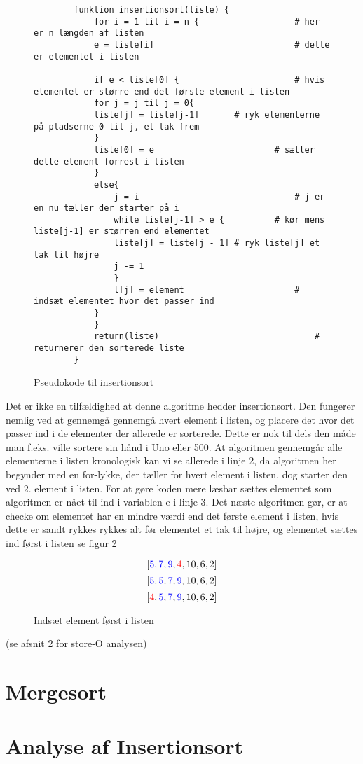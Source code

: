 \begin{figure}
	\begin{center}

		\begin{lstlisting}
		funktion insertionsort(liste) {
			for i = 1 til i = n {					# her er n længden af listen
			e = liste[i]	 						# dette er elementet i listen

			if e < liste[0] {						# hvis elementet er større end det første element i listen
			for j = j til j = 0{ 
			liste[j] = liste[j-1]		# ryk elementerne på pladserne 0 til j, et tak frem
			}
			liste[0] = e 						# sætter dette element forrest i listen
			}
			else{
				j = i 								# j er en nu tæller der starter på i
				while liste[j-1] > e {			# kør mens liste[j-1] er størren end elementet
				liste[j] = liste[j - 1] # ryk liste[j] et tak til højre
				j -= 1
				}
				l[j] = element						# indsæt elementet hvor det passer ind
			}
			}			
			return(liste)								# returnerer den sorterede liste
		}

		\end{lstlisting}
	\end{center}
	\caption{Pseudokode til insertionsort}
	\label{fig:Pseudokode til insertionsort}
\end{figure}


Det er ikke en tilfældighed at denne algoritme hedder insertionsort. Den fungerer nemlig ved at gennemgå gennemgå hvert element i listen, og placere det hvor det passer ind i de elementer der allerede er sorterede. Dette er nok til dels den måde man f.eks. ville sortere sin hånd i Uno eller 500. At algoritmen gennemgår alle elementerne i listen kronologisk kan vi se allerede i linje 2, da algoritmen her begynder med en for-lykke, der tæller for hvert element i listen, dog starter den ved 2. element i listen. For at gøre koden mere læsbar sættes elementet som algoritmen er nået til ind i variablen e i linje 3. Det næste algoritmen gør, er at checke om elementet har en mindre værdi end det første element i listen, hvis dette er sandt rykkes rykkes alt før elementet et tak til højre, og elementet sættes ind først i listen se figur \ref{fig:Indsæt element først i listen}


\begin{figure}
	\begin{center}
		$$[\color{blue}5\color{black},\color{blue}7\color{black},\color{blue}9\color{black},\color{red}4\color{black},10,6,2]$$
		$$[\color{blue}5\color{black},\color{blue}5\color{black},\color{blue}7\color{black},\color{blue}9\color{black},10,6,2]$$
		$$[\color{red}4\color{black},\color{blue}5\color{black},\color{blue}7\color{black},\color{blue}9\color{black},10,6,2]$$
	\end{center}
	\caption{Indsæt element først i listen}
	\label{fig:Indsæt element først i listen}
\end{figure}


(se afsnit \ref{sec:Analyse af Insertionsort} for store-O analysen)

\section{Mergesort}
\label{sec:Mergesort}

%

\section{Analyse af Insertionsort}
\label{sec:Analyse af Insertionsort}



